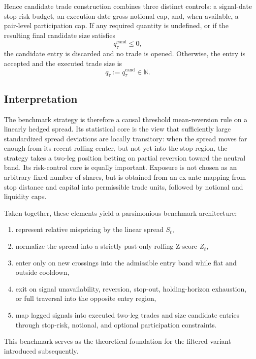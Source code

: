 \documentclass[11pt,a4paper]{article}
\begin{document}
Hence candidate trade construction combines three distinct controls: a
signal-date stop-risk budget, an execution-date gross-notional cap, and, when
available, a pair-level participation cap. If any required quantity is
undefined, or if the resulting final candidate size satisfies
\[
  q_\tau^{\mathrm{cand}} \le 0,
\]
the candidate entry is discarded and no trade is opened. Otherwise, the entry
is accepted and the executed trade size is
\[
  q_\tau := q_\tau^{\mathrm{cand}} \in \mathbb N.
\]

\subsection{Interpretation}

The benchmark strategy is therefore a causal threshold mean-reversion rule on a
linearly hedged spread. Its statistical core is the view that sufficiently
large standardized spread deviations are locally transitory: when the spread
moves far enough from its recent rolling center, but not yet into the stop
region, the strategy takes a two-leg position betting on partial reversion
toward the neutral band. Its risk-control core is equally important. Exposure
is not chosen as an arbitrary fixed number of shares, but is obtained from an
ex ante mapping from stop distance and capital into permissible trade units,
followed by notional and liquidity caps.

Taken together, these elements yield a parsimonious benchmark architecture:
\begin{enumerate}[leftmargin=*, itemsep=2pt, topsep=2pt]
  \item represent relative mispricing by the linear spread \(S_t\),
  \item normalize the spread into a strictly past-only rolling Z-score \(Z_t\),
  \item enter only on new crossings into the admissible entry band while flat
        and outside cooldown,
  \item exit on signal unavailability, reversion, stop-out, holding-horizon
        exhaustion, or full traversal into the opposite entry region,
  \item map lagged signals into executed two-leg trades and size candidate
        entries through stop-risk, notional, and optional participation
        constraints.
\end{enumerate}
This benchmark serves as the theoretical foundation for the filtered variant
introduced subsequently.
\end{document}
